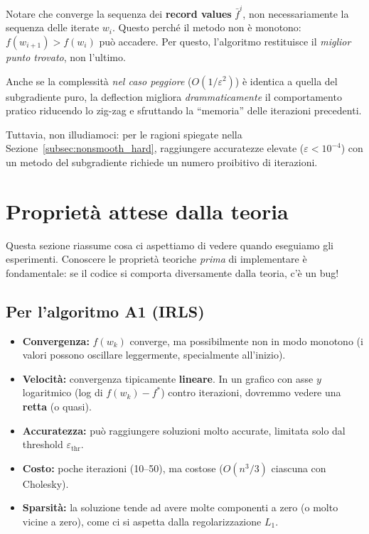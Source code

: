 \documentclass[a4paper,11pt]{article}
\theoremstyle{definition}
\begin{document}
\begin{intuizione}
Notare che converge la sequenza dei \textbf{record values} $\bar{f}^i$, non necessariamente la sequenza delle iterate $w_i$. Questo perché il metodo non è monotono: $f(w_{i+1}) > f(w_i)$ può accadere. Per questo, l'algoritmo restituisce il \emph{miglior punto trovato}, non l'ultimo.

Anche se la complessità \emph{nel caso peggiore} ($O(1/\varepsilon^2)$) è identica a quella del subgradiente puro, la deflection migliora \emph{drammaticamente} il comportamento pratico riducendo lo zig-zag e sfruttando la ``memoria'' delle iterazioni precedenti.

Tuttavia, non illudiamoci: per le ragioni spiegate nella Sezione~\ref{subsec:nonsmooth_hard}, raggiungere accuratezze elevate ($\varepsilon < 10^{-4}$) con un metodo del subgradiente richiede un numero proibitivo di iterazioni.
\end{intuizione}

\section{Proprietà attese dalla teoria}
\label{sec:expected_properties}

\begin{intuizione}
Questa sezione riassume cosa ci aspettiamo di vedere quando eseguiamo gli esperimenti. Conoscere le proprietà teoriche \emph{prima} di implementare è fondamentale: se il codice si comporta diversamente dalla teoria, c'è un bug!
\end{intuizione}

\subsection{Per l'algoritmo A1 (IRLS)}
\begin{itemize}
  \item \textbf{Convergenza:} $f(w_k)$ converge, ma possibilmente non in modo monotono (i valori possono oscillare leggermente, specialmente all'inizio).
  \item \textbf{Velocità:} convergenza tipicamente \textbf{lineare}. In un grafico con asse $y$ logaritmico (log di $f(w_k) - f^*$) contro iterazioni, dovremmo vedere una \textbf{retta} (o quasi).
  \item \textbf{Accuratezza:} può raggiungere soluzioni molto accurate, limitata solo dal threshold $\varepsilon_{\text{thr}}$.
  \item \textbf{Costo:} poche iterazioni (10--50), ma costose ($O(n^3/3)$ ciascuna con Cholesky).
  \item \textbf{Sparsità:} la soluzione tende ad avere molte componenti a zero (o molto vicine a zero), come ci si aspetta dalla regolarizzazione $L_1$.
\end{itemize}
\end{document}
